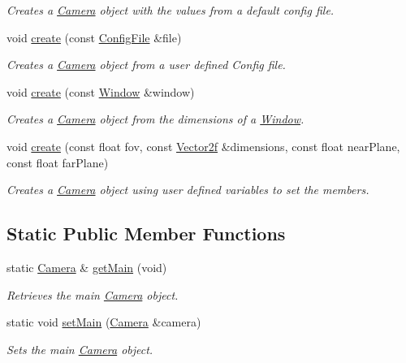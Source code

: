 \begin{DoxyCompactItemize}
\begin{DoxyCompactList}\small\item\em Creates a \hyperlink{classsparky_1_1_camera}{Camera} object with the values from a default config file. \end{DoxyCompactList}\item 
void \hyperlink{classsparky_1_1_camera_ad4e0090b1055bb9df2a1b197378f44ac}{create} (const \hyperlink{classsparky_1_1_config_file}{Config\+File} \&file)
\begin{DoxyCompactList}\small\item\em Creates a \hyperlink{classsparky_1_1_camera}{Camera} object from a user defined Config file. \end{DoxyCompactList}\item 
void \hyperlink{classsparky_1_1_camera_a132a99839bb8b5503542c4d51b36b812}{create} (const \hyperlink{classsparky_1_1_window}{Window} \&window)
\begin{DoxyCompactList}\small\item\em Creates a \hyperlink{classsparky_1_1_camera}{Camera} object from the dimensions of a \hyperlink{classsparky_1_1_window}{Window}. \end{DoxyCompactList}\item 
void \hyperlink{classsparky_1_1_camera_ae36c11df78944a6a2939aa63468d2f09}{create} (const float fov, const \hyperlink{classsparky_1_1_vector2}{Vector2f} \&dimensions, const float near\+Plane, const float far\+Plane)
\begin{DoxyCompactList}\small\item\em Creates a \hyperlink{classsparky_1_1_camera}{Camera} object using user defined variables to set the members. \end{DoxyCompactList}\end{DoxyCompactItemize}
\subsection*{Static Public Member Functions}
\begin{DoxyCompactItemize}
\item 
static \hyperlink{classsparky_1_1_camera}{Camera} \& \hyperlink{classsparky_1_1_camera_ac96a241b1a97d9c70fa61ddfc784acb5}{get\+Main} (void)
\begin{DoxyCompactList}\small\item\em Retrieves the main \hyperlink{classsparky_1_1_camera}{Camera} object. \end{DoxyCompactList}\item 
static void \hyperlink{classsparky_1_1_camera_a025e6323785c997e525609dbb7bc2011}{set\+Main} (\hyperlink{classsparky_1_1_camera}{Camera} \&camera)
\begin{DoxyCompactList}\small\item\em Sets the main \hyperlink{classsparky_1_1_camera}{Camera} object. \end{DoxyCompactList}\end{DoxyCompactItemize}


